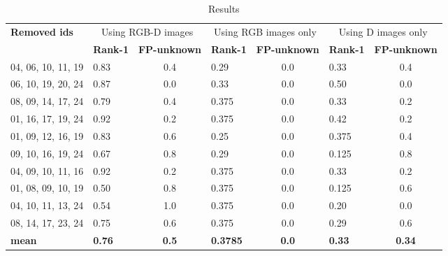 \documentclass{article}
\begin{document}
\begin{table}[]
	\begin{adjustwidth}{-.75in}{-.75in}
		\centering
		\caption{Results}
		\label{tab:results}
		\begin{tabular}{|l|l|c|l|c|l|c|}
			\hline
			\multirow{2}{*}{\bf Removed ids} & \multicolumn{2}{c|}{Using RGB-D images} &\multicolumn{2}{c|}{Using RGB images only} &\multicolumn{2}{c|}{Using D images only} \\ \cline{2-7}
							 & \bf Rank-1 & \bf FP-unknown            & \bf Rank-1 & \bf FP-unknown              & \bf Rank-1 & \bf FP-unknown  \\ \hline
			04, 06, 10, 11, 19               & 0.83	      & 0.4                       & 0.29       & 0.0                         & 0.33       & 0.4\\ \hline
			06, 10, 19, 20, 24               & 0.87	      & 0.0                       & 0.33       & 0.0                         & 0.50       & 0.0\\ \hline
			08, 09, 14, 17, 24               & 0.79	      & 0.4                       & 0.375      & 0.0                         & 0.33       & 0.2\\ \hline
			01, 16, 17, 19, 24               & 0.92	      & 0.2                       & 0.375      & 0.0                         & 0.42       & 0.2\\ \hline
			01, 09, 12, 16, 19               & 0.83	      & 0.6                       & 0.25       & 0.0                         & 0.375      & 0.4\\ \hline
			09, 10, 16, 19, 24               & 0.67	      & 0.8                       & 0.29       & 0.0                         & 0.125      & 0.8\\ \hline
			04, 09, 10, 11, 16               & 0.92	      & 0.2                       & 0.375      & 0.0                         & 0.33       & 0.2\\ \hline
			01, 08, 09, 10, 19               & 0.50	      & 0.8                       & 0.375      & 0.0                         & 0.125      & 0.6\\ \hline
			04, 10, 11, 13, 24               & 0.54	      & 1.0                       & 0.375      & 0.0                         & 0.20       & 0.0\\ \hline
			08, 14, 17, 23, 24               & 0.75	      & 0.6                       & 0.375      & 0.0                         & 0.29       & 0.6\\ \hline
			\bf mean                         & \bf 0.76   & \bf 0.5                   & \bf 0.3785 & \bf 0.0                     & \bf 0.33   & \bf 0.34\\ \hline
		\end{tabular}
	\end{adjustwidth}
\end{table}
\end{document}
